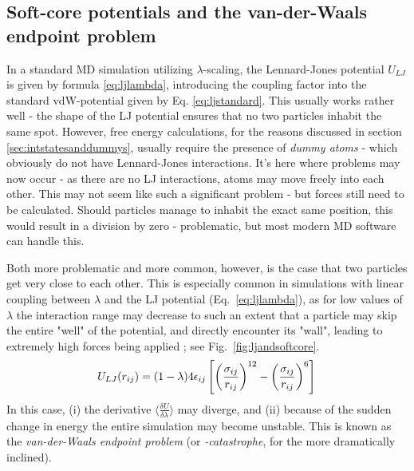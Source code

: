 \documentclass[oneside]{scrreprt}
\begin{document}
\subsection{Soft-core potentials and the van-der-Waals endpoint problem} \label{sec:vdwproblem}
In a standard MD simulation utilizing $\lambda$-scaling, the Lennard-Jones potential $U_{LJ}$ is given by formula \ref{eq:ljlambda}, introducing the coupling factor into the standard vdW-potential given by Eq. \ref{eq:ljstandard}. This usually works rather well -  the shape of the LJ potential ensures that no two  particles inhabit the same spot. However, free energy calculations, for the reasons discussed in section \ref{sec:intstatesanddummys}, usually require the presence of \textit{dummy atoms} - which obviously do not have Lennard-Jones interactions. It's here where problems may now occur -  as there are no LJ interactions, atoms may move freely into each other. This may not seem like such a significant problem - but forces still need to be calculated. Should particles manage to inhabit the exact same position, this would result in a division by zero - problematic, but most modern MD software can handle this. 


Both more problematic and more common, however, is the case that two particles get very close to each other. This is especially common in simulations with linear coupling between $\lambda$ and the LJ potential (Eq.~\ref{eq:ljlambda}), as for low values of $\lambda$ the interaction range may decrease to such an extent that a particle may skip the entire "well" of the potential, and directly encounter its "wall", leading to extremely high forces being applied \cite{Beutler1994Jun,boresch_avoiding_2011}; see Fig.~\ref{fig:ljandsoftcore}. 
\begin{equation}
U_{LJ}(r_{ij})=(1-\lambda)4\epsilon_{ij}\left[\left(\frac{\sigma_{ij}}{r_{ij}}\right)^{12} - \left(\frac{\sigma_{ij}}{r_{ij}}\right)^6\right] \label{eq:ljlambda} \\
\end{equation}
In this case, (i) the derivative $\langle \frac{\delta U}{\delta\lambda} \rangle$ may diverge, and (ii) because of the sudden change in energy the entire simulation may become unstable. This is known as the \textit{van-der-Waals endpoint problem} (or \textit{-catastrophe}, for the more dramatically inclined).
\end{document}
